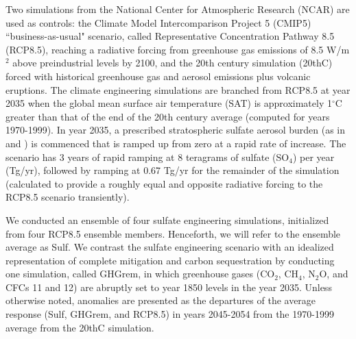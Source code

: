 \documentclass[draft,grl]{AGUTeX}  %
\begin{document}
\begin{article}
Two simulations from the National Center for Atmospheric Research (NCAR) are used as controls: the Climate Model Intercomparison Project 5 (CMIP5) ``business-as-usual" scenario, called Representative Concentration Pathway 8.5 (RCP8.5), reaching a radiative forcing from greenhouse gas emissions of 8.5 W/m$^{2}$ above preindustrial levels by 2100, and the 20th century simulation (20thC) forced with historical greenhouse gas and aerosol emissions plus volcanic eruptions. The climate engineering simulations are branched from RCP8.5 at year 2035 when the global mean surface air temperature (SAT) is approximately 1$^\circ$C greater than that of the end of the 20th century average (computed for years 1970-1999). In year 2035, a prescribed stratospheric sulfate aerosol burden (as in \citet{mccusker12} and \citet{mccusker14}) is commenced that is ramped up from zero at a rapid rate of increase. The scenario has 3 years of rapid ramping at 8 teragrams of sulfate (SO$_4$) per year (Tg/yr), followed by ramping at 0.67 Tg/yr for the remainder of the simulation (calculated to provide a roughly equal and opposite radiative forcing to the RCP8.5 scenario transiently). %

We conducted an ensemble of four sulfate engineering simulations, initialized from four RCP8.5 ensemble members. Henceforth, we will refer to the ensemble average as Sulf. We contrast the sulfate engineering scenario with an idealized representation of complete mitigation and carbon sequestration by conducting one simulation, called GHGrem, in which greenhouse gases (CO$_2$, CH$_4$, N$_2$O, and CFCs 11 and 12) are abruptly set to year 1850 levels in the year 2035. Unless otherwise noted, anomalies are presented as the departures of the average response (Sulf, GHGrem, and RCP8.5) in years 2045-2054 from the 1970-1999 average from the 20thC simulation.%


\end{article}
\end{document}
